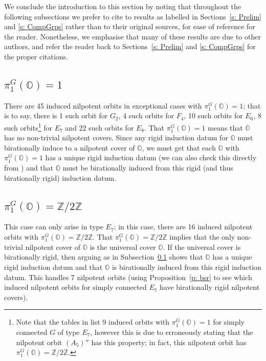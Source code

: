 \documentclass[11pt]{amsart}
\renewcommand{\O}{{\mathbb O}}
\newcommand{\bZ}{{\mathbb Z}}
\newcommand{\hatO}{\widehat{\O}}
\numberwithin{equation}{section}
\begin{document}
	We conclude the introduction to this section by noting that throughout the following subsections we prefer to cite to results as labelled in Sections~\ref{s: Prelim} and \ref{s: CompGrps} rather than to their original sources, for ease of reference for the reader. Nonetheless, we emphasise that many of these results are due to other authors, and refer the reader back to Sections~\ref{s: Prelim} and \ref{s: CompGrps} for the proper citations.
	
	
	\subsection{\texorpdfstring{$\pi_1^G(\O)=1$}{pi=1}}\label{ss: pi=1}
	
	There are 45 induced nilpotent orbits in exceptional cases with $\pi_1^G(\O)=1$; that is to say, there is 1 such orbit for $G_2$, 4 such orbits for $F_4$, 10 such orbits for $E_6$, 8 such orbits\footnote{Note that the tables in \cite[\S 8.4]{CM} list 9 induced orbits with $\pi_1^G(\O)=1$ for simply connected $G$ of type $E_7$, however this is due to erroneously stating that the nilpotent orbit $(A_5)''$ has this property; in fact, this nilpotent orbit has $\pi_1^G(\O)=\bZ/2\bZ$.} for $E_7$ and 22 such orbits for $E_8$. That $\pi_1^G(\O)=1$ means that $\O$ has no non-trivial nilpotent covers. Since any rigid induction datum for $\O$ must birationally induce to a nilpotent cover of $\O$, we must get that each $\O$ with $\pi_1^G(\O)=1$ has a unique rigid induction datum (we can also check this directly from \cite{EdG}) and that $\O$ must be birationally induced from this rigid (and thus birationally rigid) induction datum.
	
	\subsection{\texorpdfstring{$\pi_1^G(\O)=\bZ/2\bZ$}{pi=Z2}}\label{ss: pi=Z2}
	
	This case can only arise in type $E_7$; in this case, there are 16 induced nilpotent orbits with $\pi_1^G(\O)=\bZ/2\bZ$. That $\pi_1^G(\O)=\bZ/2\bZ$ implies that the only non-trivial nilpotent cover of $\O$ is the universal cover $\hatO$. If the universal cover is birationally rigid, then arguing as in Subsection~\ref{ss: pi=1} shows that $\O$ has a unique rigid induction datum and that $\O$ is birationally induced from this rigid induction datum. This handles 7 nilpotent orbits (using Proposition~\ref{p: bsr} to see which induced nilpotent orbits for simply connected $E_7$ have birationally rigid nilpotent covers).
	
\end{document}
